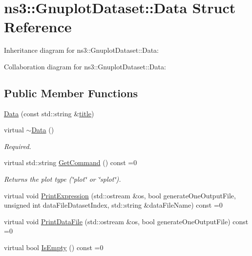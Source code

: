 \hypertarget{structns3_1_1GnuplotDataset_1_1Data}{}\section{ns3\+:\+:Gnuplot\+Dataset\+:\+:Data Struct Reference}
\label{structns3_1_1GnuplotDataset_1_1Data}


Inheritance diagram for ns3\+:\+:Gnuplot\+Dataset\+:\+:Data\+:


Collaboration diagram for ns3\+:\+:Gnuplot\+Dataset\+:\+:Data\+:
\subsection*{Public Member Functions}
\begin{DoxyCompactItemize}
\item 
\hyperlink{structns3_1_1GnuplotDataset_1_1Data_aac14f48187c023637a230a924c7064a2}{Data} (const std\+::string \&\hyperlink{lte__link__budget__x2__handover__measures_8m_a3f4b991df405379f6917e1683ed5a8c8}{title})
\item 
virtual \hyperlink{structns3_1_1GnuplotDataset_1_1Data_a859d73525c0f98ba04aa48b126049e1e}{$\sim$\+Data} ()
\begin{DoxyCompactList}\small\item\em Required. \end{DoxyCompactList}\item 
virtual std\+::string \hyperlink{structns3_1_1GnuplotDataset_1_1Data_aeb126295cbdb436406bcbdf052f1ac9a}{Get\+Command} () const =0
\begin{DoxyCompactList}\small\item\em Returns the plot type (\char`\"{}plot\char`\"{} or \char`\"{}splot\char`\"{}). \end{DoxyCompactList}\item 
virtual void \hyperlink{structns3_1_1GnuplotDataset_1_1Data_a32abe64267aadedf111251f9b5d33009}{Print\+Expression} (std\+::ostream \&os, bool generate\+One\+Output\+File, unsigned int data\+File\+Dataset\+Index, std\+::string \&data\+File\+Name) const =0
\item 
virtual void \hyperlink{structns3_1_1GnuplotDataset_1_1Data_a8ff2b7e8f90e63dba2bcda3e3522933d}{Print\+Data\+File} (std\+::ostream \&os, bool generate\+One\+Output\+File) const =0
\item 
virtual bool \hyperlink{structns3_1_1GnuplotDataset_1_1Data_aa6f88cd2a6161ddec88c31dd48f1ee73}{Is\+Empty} () const =0
\end{DoxyCompactItemize}
